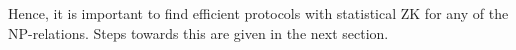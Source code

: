
Hence, it is important to find efficient protocols with statistical ZK for any of the NP-relations.
Steps towards this are given in the next section.

